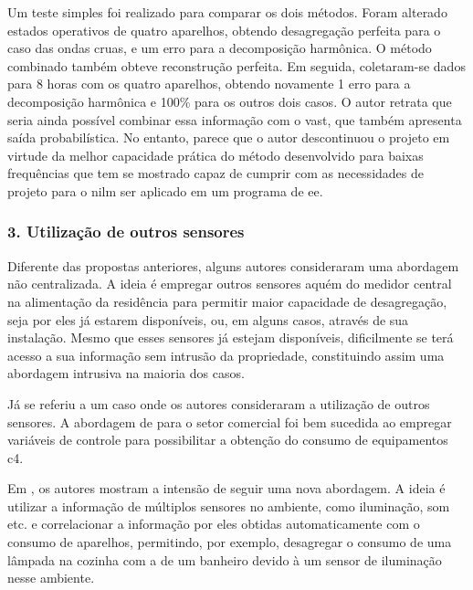 \begin{enumerate}[label=\textbf{2.\arabic*},wide=\parindent]
Um teste simples foi realizado para comparar os dois métodos. Foram
alterado estados operativos de quatro aparelhos, obtendo desagregação
perfeita para o caso das ondas cruas, e um erro para a decomposição
harmônica. O método combinado também obteve reconstrução perfeita.
Em seguida, coletaram-se dados para 8 horas com os quatro aparelhos,
obtendo novamente 1 erro para a decomposição harmônica e 100\% para os
outros dois casos. O autor retrata que seria ainda possível combinar
essa informação com o \gls{vast}, que também apresenta saída
probabilística. No entanto, parece que o autor descontinuou o projeto
em virtude da melhor capacidade prática do método desenvolvido para
baixas frequências que tem se mostrado capaz de cumprir com as
necessidades de projeto para o \gls{nilm} ser aplicado em um programa
de \gls{ee}.

\end{enumerate}

\subsubsection{3. Utilização de outros sensores}
\label{top:seminilm}

Diferente das propostas anteriores, alguns autores consideraram uma
abordagem não centralizada. A ideia é empregar outros sensores aquém
do medidor central na alimentação da residência para permitir maior
capacidade de desagregação, seja por eles já estarem disponíveis, ou,
em alguns casos, através de sua instalação. Mesmo que esses sensores
já estejam disponíveis, dificilmente se terá acesso a sua informação
sem intrusão da propriedade, constituindo assim uma abordagem
intrusiva na maioria dos casos.

Já se referiu a um caso onde os autores consideraram a utilização de
outros sensores. A abordagem de
\cite{nilm_norford_leeb_medianfilt_1996_13} para o setor comercial foi
bem sucedida ao empregar variáveis de controle para possibilitar a
obtenção do consumo de equipamentos \gls{c4}. 

Em \cite{seminilm_berges_multisensor_2010}, os autores mostram a
intensão de seguir uma nova abordagem. A ideia é utilizar a informação
de múltiplos sensores no ambiente, como iluminação, som etc. e
correlacionar a informação por eles obtidas automaticamente com o
consumo de aparelhos, permitindo, por exemplo, desagregar o consumo de
uma lâmpada na cozinha com a de um banheiro devido à um sensor de
iluminação nesse ambiente.

